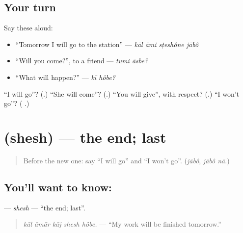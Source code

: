 \subsection*{Your turn}
Say these aloud:

\begin{itemize}
\raggedright
  \item \textquotedblleft{}Tomorrow I will go to the station\textquotedblright{} — \emph{kāl āmi sṭeshône jābô}
  \item \textquotedblleft{}Will you come?\textquotedblright{}, to a friend — \emph{tumi āsbe?}
  \item \textquotedblleft{}What will happen?\textquotedblright{} — \emph{kī hôbe?}
\end{itemize}

\begin{tcolorbox}[breakable,colback=teal!4,colframe=teal!35!black,title={Before you move on}]
\textquotedblleft{}I will go\textquotedblright{}? (\textbf{}.) \textquotedblleft{}She will come\textquotedblright{}? (\textbf{}.) \textquotedblleft{}You will give\textquotedblright{}, with respect? (\textbf{}.) \textquotedblleft{}I won't go\textquotedblright{}? (\textbf{ }.)
\end{tcolorbox}
\section[\texorpdfstring{\bn{শেষ} (shesh)}{শেষ (shesh)}]{ (shesh) — the end; last}

\label{lesson:BN-C265-shesh}



\begin{quote}
Before the new one: say \textquotedblleft{}I will go\textquotedblright{} and \textquotedblleft{}I won't go\textquotedblright{}. (\emph{jābô}, \emph{jābô nā}.)
\end{quote}

\subsection*{You'll want to know: }
\textbf{} — \emph{shesh} — \textquotedblleft{}the end; last\textquotedblright{}.

\begin{quote}
\textbf{    }
\end{quote}

\begin{quote}
\emph{kāl āmār kāj shesh hôbe.} — \textquotedblleft{}My work will be finished tomorrow.\textquotedblright{}
\end{quote}

